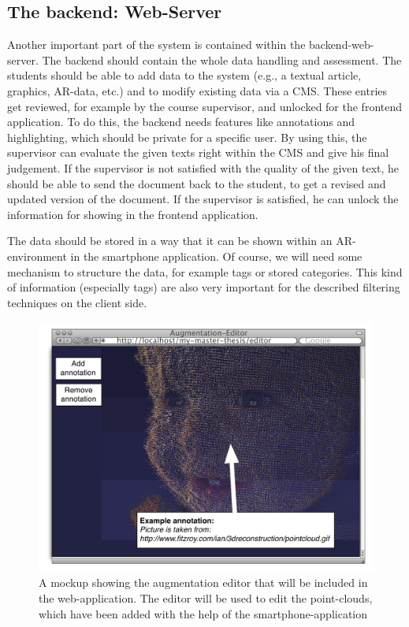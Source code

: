 \documentclass[a4page]{article}
\begin{document}
\subsection{The backend: Web-Server} 
Another important part of the system is contained within the backend-web-server. The backend should contain the whole data handling and assessment. The students should be able to add data to the system (e.g., a textual article, graphics, \ac{AR}-data, etc.) and to modify existing data via a \ac{CMS}. These entries get reviewed, for example by the course supervisor, and unlocked for the frontend application. To do this, the backend needs features like annotations and highlighting, which should be private for a specific user. By using this, the supervisor can evaluate the given texts right within the \ac{CMS} and give his final judgement. If the supervisor is not satisfied with the quality of the given text, he should be able to send the document back to the student, to get a revised and updated version of the document. If the supervisor is satisfied, he can unlock the information for showing in the frontend application.

The data should be stored in a way that it can be shown within an \ac{AR}-environment in the smartphone application. Of course, we will need some mechanism to structure the data, for example tags or stored categories. This kind of information (especially tags) are also very important for the described filtering techniques on the client side.

\begin{figure}[th]
\centerline{\includegraphics[width=1\textwidth]{gfx/mockup_web_1}}
\caption{A mockup showing the augmentation editor that will be included in the web-application. The editor will be used to edit the point-clouds, which have been added with the help of the smartphone-application}
\label{web1}
\end{figure}
\end{document}

